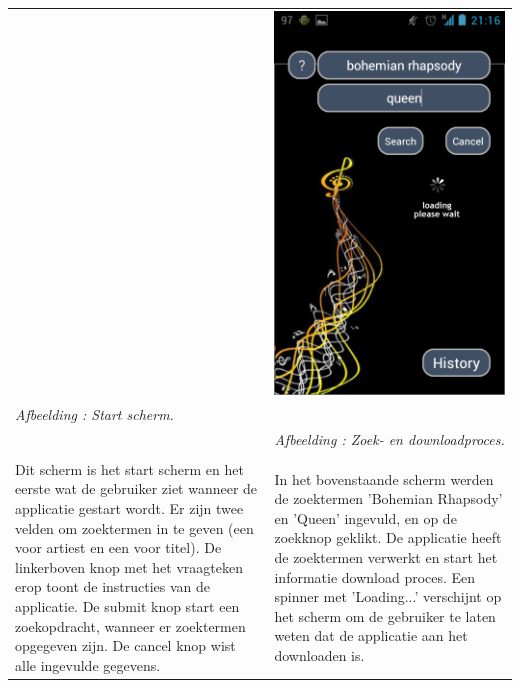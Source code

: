 \documentclass[11pt,a4paper]{article}
\newcounter{figc}
\newcommand{\increaseFigID} {%
   \stepcounter{figc}%
   \thefigc}
\newcommand{\figID}[1]{\small \textit{Afbeelding \increaseFigID : #1} \\ \normalsize}
\begin{document}
{\begin{tabular} {p{7cm} >{\centering\arraybackslash}p{7cm}@{\hskip 0.5in}}
		& \includegraphics[scale=0.28]{Pictures/Screenshot_2013-05-24-21-16-07.png} \\
		
		\centering \figID{Start scherm.} 
		& \figID{Zoek- en downloadproces.} 
		
		\vspace{1pt} & \vspace{1pt} \\
		
	\multicolumn{1}{p{7cm}|}{%
				Dit scherm is het start scherm en het eerste wat de gebruiker ziet wanneer de applicatie gestart wordt. Er zijn twee velden om zoektermen in te geven (een voor artiest en een voor titel). De linkerboven knop met het vraagteken erop toont de instructies van de applicatie. De submit knop start een zoekopdracht, wanneer er zoektermen opgegeven zijn. De cancel knop wist alle ingevulde gegevens. }
	&	
	\multicolumn{1}{p{7cm}} {%
				In het bovenstaande scherm werden de zoektermen 'Bohemian Rhapsody' en 'Queen' ingevuld, en op de zoekknop geklikt. De applicatie heeft de zoektermen verwerkt en start het informatie download proces. Een spinner met 'Loading...' verschijnt op het scherm om de gebruiker te laten weten dat de applicatie aan het downloaden is. } 	
				\end{tabular} 
}
\end{document}
